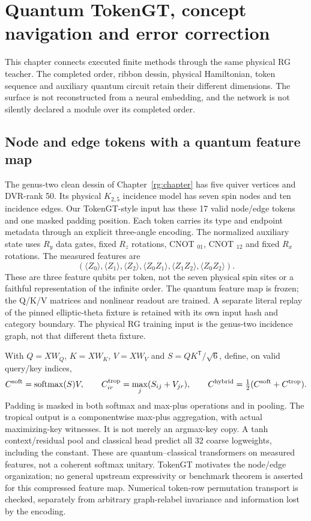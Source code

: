 \chapter{Quantum TokenGT, concept navigation and error correction}
\label{qtoken:chapter}
This chapter connects executed finite methods through the same physical RG
teacher. The completed order, ribbon dessin, physical Hamiltonian, token
sequence and auxiliary quantum circuit retain their different dimensions.
The surface is not reconstructed from a neural embedding, and the network
is not silently declared a module over its completed order.

\section{Node and edge tokens with a quantum feature map}
The genus-two clean dessin of Chapter~\ref{rg:chapter} has five quiver
vertices and DVR-rank 50. Its physical $ K_{2,5}$ incidence model has seven
spin nodes and ten incidence edges. Our TokenGT-style input has these 17
valid node/edge tokens and one masked padding position. Each token carries
its type and endpoint metadata through an explicit three-angle encoding.
The normalized auxiliary state uses $ R_y $ data gates, fixed $ R_z $ rotations,
CNOT $_{01}$, CNOT $_{12}$ and fixed $ R_x $ rotations. The measured features are
\[
 (\langle Z_0\rangle,\langle Z_1\rangle,\langle Z_2\rangle,
   \langle Z_0 Z_1\rangle,\langle Z_1 Z_2\rangle,\langle Z_0 Z_2\rangle).
\]
These are three feature qubits per token, not the seven physical spin sites
or a faithful representation of the infinite order. The quantum feature map
is frozen; the Q/K/V matrices and nonlinear readout are trained. A separate
literal replay of the pinned elliptic-theta fixture is retained with its
own input hash and category boundary. The physical RG training input is the
genus-two incidence graph, not that different theta fixture.

With $ Q=XW_Q $, $ K=XW_K $, $ V=XW_V $ and $ S=QK^{\mathsf{T}}/\sqrt{6}$, define,
on valid query/key indices,
\[
 C^{\rm soft}=\operatorname{softmax}(S)V,
 \qquad C^{\rm trop}_{ir}=\max_j(S_{ij}+V_{jr}),
 \qquad C^{\rm hybrid}=\tfrac 12(C^{\rm soft}+C^{\rm trop}).
\]
Padding is masked in both softmax and max-plus operations and in pooling.
The tropical output is a componentwise max-plus aggregation, with actual
maximizing-key witnesses. It is not merely an argmax-key copy. A tanh
context/residual pool and classical head predict all 32 coarse logweights,
including the constant. These are quantum--classical transformers on measured
features, not a coherent softmax unitary. TokenGT \cite{QTokenGT} motivates
the node/edge organization; no general upstream expressivity or benchmark
theorem is asserted for this compressed feature map. Numerical token-row
permutation transport is checked, separately from arbitrary graph-relabel
invariance and information lost by the encoding.

